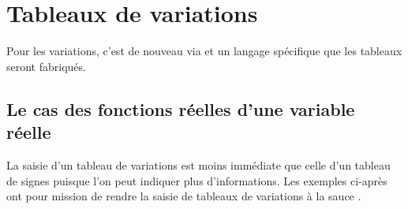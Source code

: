 \documentclass[12pt, a4paper]{article}
\begin{document}
\section{Tableaux de variations}

\begin{tdocnote}
	Pour les variations, c'est de nouveau via  et un langage spécifique que les tableaux seront fabriqués.
\end{tdocnote}




\subsection{Le cas des fonctions réelles d'une variable réelle}

La saisie d'un tableau de variations est moins immédiate que celle d'un tableau de signes puisque l'on peut indiquer plus d'informations. Les exemples ci-après ont pour mission de rendre  la saisie de tableaux de variations à la sauce \thispack.
\end{document}
